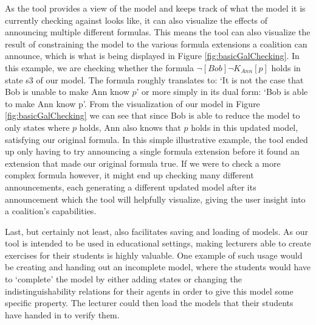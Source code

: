 As the tool provides a view of the model and keeps track of what the model it is currently checking against looks like, it can also visualize the effects of announcing multiple different formulas. This means the tool can also visualize the result of constraining the model to the various formula extensions a coalition can announce, which is what is being displayed in Figure \ref{fig:basicGalChecking}. In this example, we are checking whether the formula $\neg [Bob]\neg K_{Ann}[p]$ holds in state s3 of our model. The formula roughly translates to: `It is not the case that Bob is unable to make Ann know $p$' or more simply in its dual form: `Bob is able to make Ann know p'. From the visualization of our model in Figure \ref{fig:basicGalChecking} we can see that since Bob is able to reduce the model to only states where $p$ holds, Ann also knows that $p$ holds in this updated model, satisfying our original formula. In this simple illustrative example, the tool ended up only having to try announcing a single formula extension before it found an extension that made our original formula true. If we were to check a more complex formula however, it might end up checking many different announcements, each generating a different updated model after its announcement which the tool will helpfully visualize, giving the user insight into a coalition's capabilities. 


Last, but certainly not least, \cname{} also facilitates saving and loading of models. As our tool is intended to be used in educational settings, making lecturers able to create exercises for their students is highly valuable. One example of such usage would be creating and handing out an incomplete model, where the students would have to `complete' the model by either adding states or changing the indistinguishability relations for their agents in order to give this model some specific property. The lecturer could then load the models that their students have handed in to verify them. 



